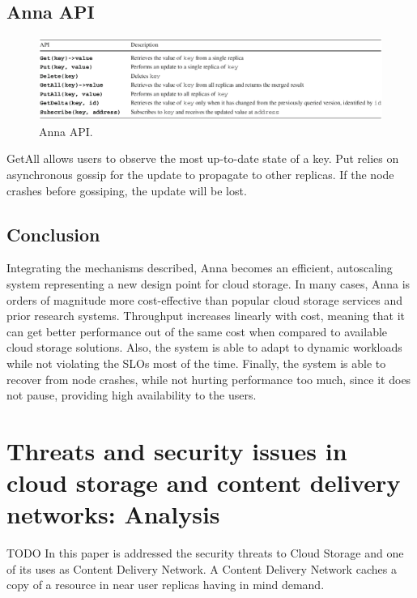 \documentclass[14pt,oneside]{extreport}
\newcommand*\fpar{\hspace{1ex}}
\begin{document}
  \section{Anna API}
  
  \begin{figure}[H]
    \centerline{\includegraphics[scale=0.5]{images/paper2/API.png}}
    \caption{Anna API.}
    \label{Anna API.}
  \end{figure}

  \fpar GetAll allows users to observe the most up-to-date state of a key. Put relies on asynchronous gossip for the update to propagate to other replicas. If the node crashes before gossiping, the update will be lost.

  \section{Conclusion}
  \fpar Integrating the mechanisms described, Anna becomes an efficient, autoscaling system representing a new design point for cloud storage. In many cases, Anna is orders of magnitude more cost-effective than popular cloud storage services and prior research systems. Throughput increases linearly with cost, meaning that it can get better performance out of the same cost when compared to available cloud storage solutions. Also, the system is able to adapt to dynamic workloads while not violating the SLOs most of the time. Finally, the system is able to recover from node crashes, while not hurting performance too much, since it does not pause, providing high availability to the users.

\chapter{\Large{Threats and security issues in cloud storage and content delivery networks: Analysis \cite{paper3}}}
\vspace{-2em}
\fpar TODO
In this paper is addressed the security threats to Cloud Storage and one of its uses as Content Delivery Network. A Content Delivery Network caches a copy of a resource in near user replicas having in mind demand.
\end{document}
